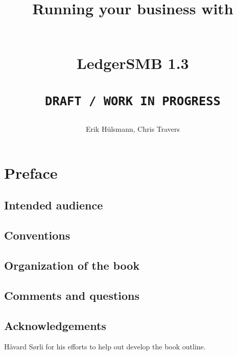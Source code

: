 \documentclass[10pt,A4]{book}
\begin{document}
\author{Erik H\"ulsmann, Chris Travers}
\title{\begin{Large}
Running your business with
\end{Large} \\
LedgerSMB 1.3 \\
 ~ \\
\texttt{DRAFT / WORK IN PROGRESS} }


\maketitle


\tableofcontents

\listoffigures

\chapter*{Preface}

\section*{Intended audience}
\section*{Conventions}
\section*{Organization of the book}
\section*{Comments and questions}
\section*{Acknowledgements}

H{\aa}vard S{\o}rli for his efforts to help out develop the book outline.








\end{document}
